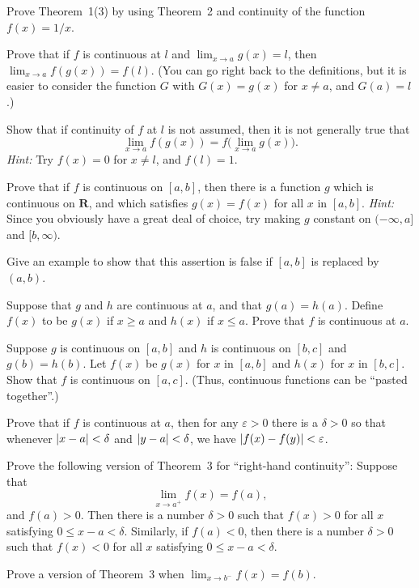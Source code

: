 Prove Theorem~1(3) by using Theorem~2 and continuity of the function
$f(x) = 1/x$.

\begin{letters}
\item Prove that if $f$ is continuous at $l$ and
  $\lim_{x \to a} g(x) = l$, then $\lim_{x \to a} f(g(x)) = f(l)$. (You
  can go right back to the definitions, but it is easier to consider the
  function $G$ with $G(x) = g(x)$ for $x \neq a$, and $G(a) = l$.)
\item Show that if continuity of $f$ at $l$ is not assumed, then it is
  not generally true that
  \[
  \lim_{x \to a} f(g(x)) = f\bigl(\lim_{x \to a} g(x)\bigr).
  \]
  \textit{Hint:} Try $f(x) = 0$ for $x \neq l$, and $f(l) = 1$.
\end{letters}

\begin{letters}
\item Prove that if $f$ is continuous on $[a,b]$, then there is a
  function $g$ which is continuous on $\mathbf{R}$, and which satisfies
  $g(x) = f(x)$ for all $x$ in $[a,b]$. \textit{Hint:} Since you
  obviously have a great deal of choice, try making $g$ constant on
  $(-\infty, a]$ and $[b, \infty)$.
\item Give an example to show that this assertion is false if $[a,b]$
  is replaced by $(a,b)$.
\end{letters}

\begin{letters}
\item Suppose that $g$ and $h$ are continuous at $a$, and that
  $g(a) = h(a)$. Define $f(x)$ to be $g(x)$ if $x \geq a$ and $h(x)$ if
  $x \leq a$. Prove that $f$ is continuous at $a$.
\item Suppose $g$ is continuous on $[a,b]$ and $h$ is continuous on
  $[b,c]$ and $g(b) = h(b)$. Let $f(x)$ be $g(x)$ for $x$ in $[a,b]$ and
  $h(x)$ for $x$ in $[b,c]$. Show that $f$ is continuous on $[a,c]$.
  (Thus, continuous functions can be ``pasted together''.)
\end{letters}

Prove that if $f$ is continuous at $a$, then for any $\varepsilon > 0$
there is a $\delta > 0$ so that whenever $\lvert x - a\rvert < \delta$ and
$\lvert y - a\rvert < \delta$, we have $\lvert f(x) - f(y)\rvert < \varepsilon$.

\begin{letters}
\item Prove the following version of Theorem~3 for ``right-hand
  continuity'': Suppose that
  \[
  \lim_{x \to a^+} f(x) = f(a),
  \]
  and $f(a) > 0$. Then there is a number $\delta > 0$ such that
  $f(x) > 0$ for all $x$ satisfying $0 \leq x - a < \delta$. Similarly,
  if $f(a) < 0$, then there is a number $\delta > 0$ such that
  $f(x) < 0$ for all $x$ satisfying $0 \leq x - a < \delta$.
\item Prove a version of Theorem~3 when $\lim_{x \to b^-} f(x) = f(b)$.
\end{letters}

